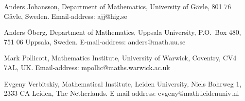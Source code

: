 \documentclass[11pt, a4paper, oneside]{scrartcl}
\theoremstyle{definition}
\theoremstyle{remark}
\begin{document}
\printbibliography

\noindent
Anders Johansson, Department of Mathematics, University of G\"avle,
801 76 G\"avle, Sweden. Email-address: ajj@hig.se\newline

\noindent
Anders \"Oberg, Department of Mathematics, Uppsala University, P.O.\
Box 480, 751 06 Uppsala, Sweden. E-mail-address:
anders@math.uu.se\newline

\noindent
Mark Pollicott, Mathematics Institute, University of Warwick,
Coventry, CV4 7AL, UK. Email-address: mpollic@maths.warwick.ac.uk\newline

\noindent
Evgeny Verbitskiy, Mathematical Institute, Leiden University,
Niels Bohrweg 1, 2333 CA Leiden, The Netherlands. E-mail address: evgeny@math.leidenuniv.nl
\end{document}

